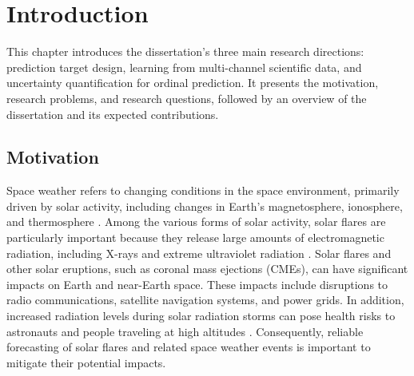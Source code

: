 \documentclass[12pt]{report}
\begin{document}
%

\clearpage

\tableofcontents
\clearpage

\listoffigures
{}
\clearpage

\listoftables
{}
\clearpage


\chapter{Introduction}
\label{chap:introduction}

This chapter introduces the dissertation's three main research directions: prediction target design, learning from multi-channel scientific data, and uncertainty quantification for ordinal prediction. It presents the motivation, research problems, and research questions, followed by an overview of the dissertation and its expected contributions.

\section{Motivation}
Space weather refers to changing conditions in the space environment, primarily driven by solar activity, including changes in Earth's magnetosphere, ionosphere, and thermosphere \cite{noaa_space_weather}. Among the various forms of solar activity, solar flares are particularly important because they release large amounts of electromagnetic radiation, including X-rays and extreme ultraviolet radiation \cite{noaa_solar_flares}. Solar flares and other solar eruptions, such as coronal mass ejections (CMEs), can have significant impacts on Earth and near-Earth space. These impacts include disruptions to radio communications, satellite navigation systems, and power grids. In addition, increased radiation levels during solar radiation storms can pose health risks to astronauts and people traveling at high altitudes \cite{noaa_space_weather_impacts}. Consequently, reliable forecasting of solar flares and related space weather events is important to mitigate their potential impacts.
\end{document}
